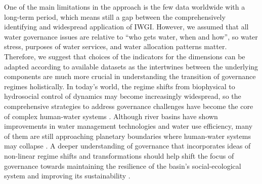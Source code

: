 One of the main limitations in the approach is the few data worldwide with a long-term period, which means still a gap between the comprehensively identifying and widespread application of IWGI.
However, we assumed that all water governance issues are relative to ``who gets water, when and how'', so water stress, purposes of water services, and water allocation patterns matter.
Therefore, we suggest that choices of the indicators for the dimensions can be adapted according to available datasets as the intertwines between the underlying components are much more crucial in understanding the transition of governance regimes holistically.
In today's world, the regime shifts from biophysical to hydrosocial control of dynamics may become increasingly widespread, so the comprehensive strategies to address governance challenges have become the core of complex human-water systems
\cite{cumming2018,cumming2014,jaeger2019}.
Although river basins have shown improvements in water management technologies and water use efficiency, many of them are still approaching planetary boundaries where human-water systems may collapse
\cite{gleeson2020, wang-erlandsson2022}.
A deeper understanding of governance that incorporates ideas of non-linear regime shifts and transformations should help shift the focus of governance towards maintaining the resilience of the basin’s social-ecological system and improving its sustainability
\cite{falkenmark2019}.
